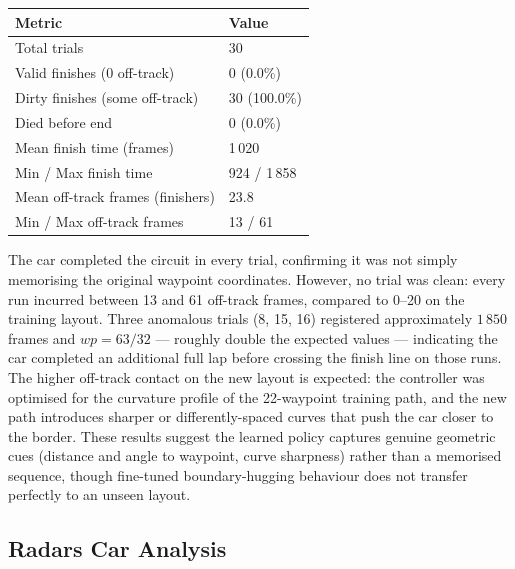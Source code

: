 \documentclass[a4paper]{article}
\begin{document}
\begin{center}
\begin{tabular}{ll}
\toprule
\textbf{Metric} & \textbf{Value} \\ \midrule
Total trials                        & 30 \\
Valid finishes (0 off-track)        & 0 \hspace{1em}(0.0\%) \\
Dirty finishes (some off-track)     & 30 (100.0\%) \\
Died before end                     & 0 \hspace{1em}(0.0\%) \\
Mean finish time (frames)           & 1\,020 \\
Min / Max finish time               & 924 / 1\,858 \\
Mean off-track frames (finishers)   & 23.8 \\
Min / Max off-track frames          & 13 / 61 \\
\bottomrule
\end{tabular}
\end{center}

The car completed the circuit in every trial, confirming it was not simply
memorising the original waypoint coordinates.
However, no trial was clean: every run incurred between 13 and 61 off-track frames,
compared to 0--20 on the training layout.
Three anomalous trials (8, 15, 16) registered approximately $1\,850$ frames and
$wp = 63/32$ --- roughly double the expected values --- indicating the car completed
an additional full lap before crossing the finish line on those runs.
The higher off-track contact on the new layout is expected: the controller was
optimised for the curvature profile of the 22-waypoint training path, and the
new path introduces sharper or differently-spaced curves that push the car closer
to the border.
These results suggest the learned policy captures genuine geometric cues
(distance and angle to waypoint, curve sharpness) rather than a memorised sequence,
though fine-tuned boundary-hugging behaviour does not transfer perfectly to an
unseen layout.

\subsection{Radars Car Analysis}
\label{subsec:radars-car-analysis}

\end{document}
